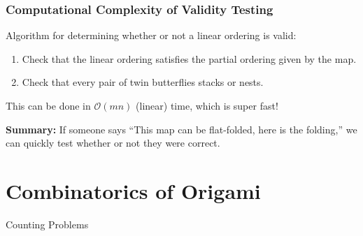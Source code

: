 \documentclass{beamer}
\begin{document}

\begin{frame}
\frametitle{Computational Complexity of Validity Testing}

Algorithm for determining whether or not a linear ordering is valid:

\pause

\begin{enumerate}
\item Check that the linear ordering satisfies the partial ordering given by the map.
\pause
\item Check that every pair of twin butterflies stacks or nests.
\end{enumerate}

\bigskip

\pause
This can be done in $\mathcal{O}(mn)$ (linear) time, which is super fast!

\bigskip

\pause

\textbf{Summary:} If someone says ``This map can be flat-folded, here is the folding,'' we can quickly test whether or not they were correct.

\end{frame}


\section{Combinatorics of Origami}

\newcommand{\R}{\mathsf{R}}
\renewcommand{\L}{\mathsf{L}}

\begin{frame}
	\begin{center}
	\Huge{Counting Problems}
	\end{center}
\end{frame}
\end{document}

